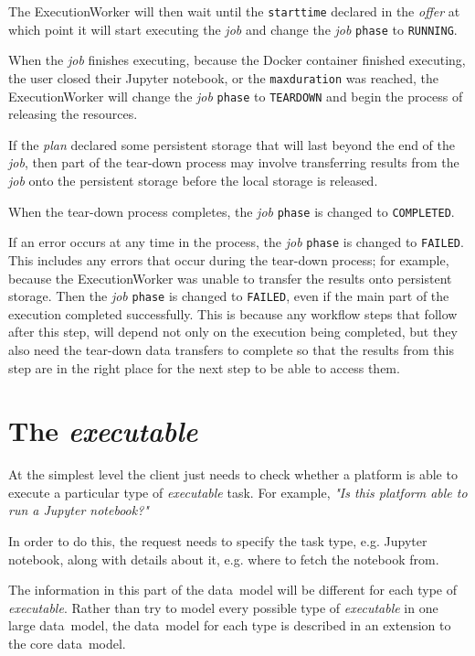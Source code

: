 \documentclass[11pt,a4paper]{ivoa}
\newcommand{\datamodel} {data~model}
\newcommand{\execworkerclass} {ExecutionWorker}
\newcommand{\jupyternotebook} {Jupyter notebook}
\newcommand{\dockercontainer} {Docker container}
\newcommand{\codeword}[1] {\texttt{#1}}
\newcommand{\executable} {\textit{executable}}
\newcommand{\excutabletask} {\textit{executable} task}
\newcommand{\execplan} {\textit{plan}}
\newcommand{\execoffer} {\textit{offer}}
\newcommand{\workerjob} {\textit{job}}
\newcommand{\teardown} {tear-down}
\begin{document}
The \execworkerclass{} will then wait until the \codeword{starttime} declared in the \execoffer{}
at which point it will start executing the \workerjob{} and change the \workerjob{} \codeword{phase}
to \codeword{RUNNING}.

When the \workerjob{} finishes executing, because the \dockercontainer{} finished executing,
the user closed their \jupyternotebook, or the \codeword{maxduration} was reached,
the \execworkerclass{} will change the \workerjob{} \codeword{phase} to \codeword{TEARDOWN} and
begin the process of releasing the resources.

If the \execplan{} declared some persistent storage that will last beyond the end of the \workerjob{},
then part of the \teardown{} process may involve transferring results from the \workerjob{}
onto the persistent storage before the local storage is released.

When the \teardown{} process completes, the \workerjob{} \codeword{phase} is changed to \codeword{COMPLETED}.

If an error occurs at any time in the process, the \workerjob{} \codeword{phase} is changed to \codeword{FAILED}.
This includes any errors that occur during the \teardown{} process; for example, because
the \execworkerclass{} was unable to transfer the results onto persistent storage.
Then the \workerjob{} \codeword{phase} is changed to \codeword{FAILED}, even if the main part of the
execution completed successfully.
This is because any workflow steps that follow after this step, will depend not only on the execution being
completed, but they also need the \teardown{} data transfers to complete so that the results from this step
are in the right place for the next step to be able to access them.

\section{The \executable{}}
\label{executable}

At the simplest level the client just needs to check whether a platform is able to execute a particular
type of \excutabletask{}.
For example, \textit{"Is this platform able to run a \jupyternotebook{}?"}

In order to do this, the request needs to specify the task type, e.g. \jupyternotebook{},
along with details about it, e.g. where to fetch the notebook from.

The information in this part of the \datamodel{} will be different for each type of \executable{}.
Rather than try to model every possible type of \executable{} in one large \datamodel{},
the \datamodel{} for each type is described in an extension to the core \datamodel{}.
\end{document}
